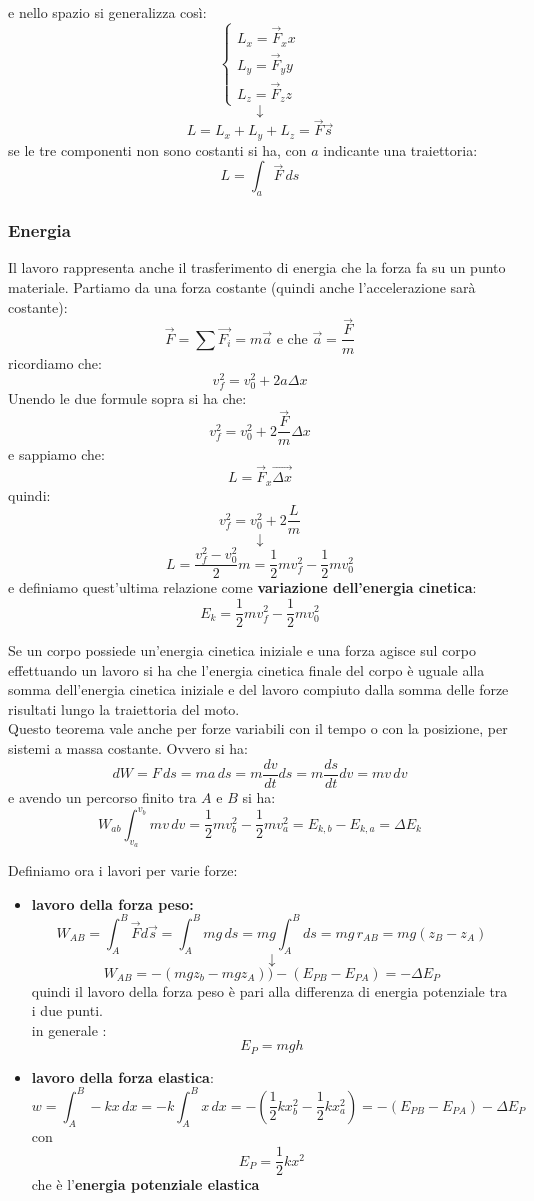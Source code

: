 \documentclass[a4paper,12pt, oneside]{book}
\begin{document}
e nello spazio si generalizza così:
$$
\begin{cases}
L_x=\vec{F}_x x\\
L_y=\vec{F}_y y\\
L_z=\vec{F}_z z
\end{cases}$$
$$\downarrow$$
$$L=L_x+L_y+L_z=\vec{F}\vec{s}$$
se le tre componenti non sono costanti si ha, con $a$ indicante una traiettoria:
$$L=\int_a \vec{F}\, ds$$
\subsubsection{Energia}
Il lavoro rappresenta anche il trasferimento di energia che la forza fa su un punto materiale. Partiamo da una forza costante (quindi anche l'accelerazione sarà costante):
$$\vec{F}=\sum\vec{F_i}=m\vec{a} \mbox{ e che } \vec{a}=\frac{\vec{F}}{m}$$
ricordiamo che:
$$v_f^2=v_0^2+2a\Delta x$$
Unendo le due formule sopra si ha che:
$$v_f^2=v_0^2+2\frac{\vec{F}}{m}\Delta x$$
e sappiamo che:
$$L=\vec{F}_x\vec{\Delta x}$$
quindi:
$$v_f^2=v_0^2+2\frac{L}{m}$$
$$\downarrow$$
$$L=\frac{v_f^2-v_0^2}{2}m=\frac{1}{2}mv_f^2-\frac{1}{2}mv_0^2$$
e definiamo quest'ultima relazione come \textbf{variazione dell'energia cinetica}:
$$E_k=\frac{1}{2}mv_f^2-\frac{1}{2}mv_0^2$$
\begin{teorema}
Se un corpo possiede un'energia cinetica iniziale e una forza agisce sul corpo effettuando un lavoro si ha che l'energia cinetica finale del corpo è uguale alla somma dell'energia cinetica iniziale e del lavoro compiuto dalla somma delle forze risultati lungo la traiettoria del moto.\\
Questo teorema vale anche per forze variabili con il tempo o con la posizione, per sistemi a massa costante. Ovvero si ha:
$$dW=F\,ds=ma\,ds=m\frac{dv}{dt}ds=m\frac{ds}{dt}dv=mv\, dv$$
e avendo un percorso finito tra $A$ e $B$ si ha:
$$W_{ab}\int_{v_a}^{v_b}mv\,dv=\frac{1}{2}mv_b^2-\frac{1}{2}mv_a^2=E_{k,b}-E_{k,a}=\Delta E_k$$
\end{teorema}
Definiamo ora i lavori per varie forze:
\begin{itemize}
\item \textbf{lavoro della forza peso:}
$$W_{AB}=\int_A^B \vec{F}d\vec{s}=\int_A^B mg\, ds=mg\int_A^B ds=mg\,r_{AB}=mg(z_B-z_A)$$
$$\downarrow$$
$$W_{AB}=-(mgz_b-mgz_A))-(E_{PB}-E_{PA})=-\Delta E_P$$
quindi il lavoro della forza peso è pari alla differenza di energia potenziale tra i due punti.\\
in generale :
$$E_P=mgh$$
\item \textbf{lavoro della forza elastica}:
$$w=\int_A^B -kx\,dx=-k\int_A^Bx\,dx=-\left(\frac{1}{2}kx_b^2-\frac{1}{2}kx_a^2\right)=-(E_{PB}-E_{PA})-\Delta E_P$$
con 
$$E_P=\frac{1}{2}kx^2$$
che è l'\textbf{energia potenziale elastica}
\end{itemize}
\end{document}

